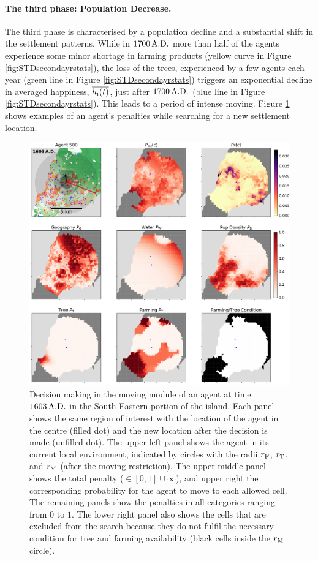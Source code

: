 \paragraph{The third phase: Population Decrease.}
The third phase is characterised by a population decline and a substantial shift in the settlement patterns.
While in $1700\,{\rm A.D.}$ more than half of the agents experience some minor shortage in farming products (yellow curve in Figure \ref{fig:STDsecondayrstats}), 
the loss of the trees, experienced by a few agents each year (green line in Figure \ref{fig:STDsecondayrstats}) triggers an exponential decline in averaged happiness, $\overline{h_{\rm i}(t)}$, just after $1700\, {\rm A.D.}$ (blue line in Figure \ref{fig:STDsecondayrstats}).
This leads to a period of intense moving.
Figure \ref{fig:penaltiesag500t1603} shows examples of an agent's penalties while searching for a new settlement location.
\begin{figure}
	\centering
	\includegraphics[width=1.3\linewidth, center]{images/Results/Standard/Penalties_AG500_t=1603_rad}
	\caption{Decision making in the moving module of an agent at time $1603\, {\rm A.D.}$ in the South Eastern portion of the island. 
		Each panel shows the same region of interest with the location of the agent in the centre (filled dot) and the new location after the decision is made (unfilled dot).
		The upper left panel shows the agent in its current local environment, indicated by circles with the radii $r_{\rm F}$, $r_{\rm T}$, and $r_{\rm M}$ (after the moving restriction). The upper middle panel shows the total penalty ($\in [0,1]\cup \infty$), and upper right the corresponding probability for the agent to move to each allowed cell. The remaining panels show the penalties in all categories ranging from $0$ to $1$.
		The lower right panel also shows the cells that are excluded from the search because they do not fulfil the necessary condition for tree and farming availability (black cells inside the $r_{\rm M}$ circle).}
	\label{fig:penaltiesag500t1603}
\end{figure}
